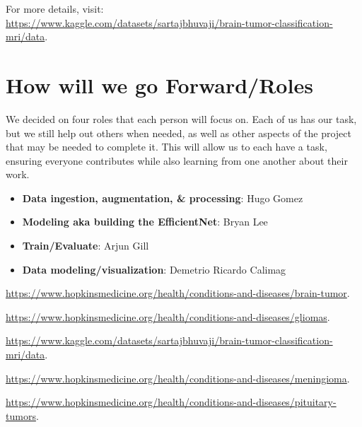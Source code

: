 \documentclass[11pt]{article}
\begin{document}
\noindent For more details, visit: \\
\href{https://www.kaggle.com/datasets/sartajbhuvaji/brain-tumor-classification-mri/data}{https://www.kaggle.com/datasets/sartajbhuvaji/brain-tumor-classification-mri/data}.

\section{How will we go Forward/Roles}
We decided on four roles that each person will focus on. Each of us has our task, but we still help out others
when needed, as well as other aspects of the project that may be needed to complete it.
This will allow us to each have a task, ensuring everyone contributes while also learning from one another about their work.
\begin{itemize}
    \item \textbf{Data ingestion, augmentation, \& processing}: Hugo Gomez
    \item \textbf{Modeling aka building the EfficientNet}: Bryan Lee
    \item \textbf{Train/Evaluate}: Arjun Gill
    \item \textbf{Data modeling/visualization}: Demetrio Ricardo Calimag
\end{itemize}

\newpage

\begin{thebibliography}{4}
    \url{https://www.hopkinsmedicine.org/health/conditions-and-diseases/brain-tumor}.
    
    \url{https://www.hopkinsmedicine.org/health/conditions-and-diseases/gliomas}.

    \url{https://www.kaggle.com/datasets/sartajbhuvaji/brain-tumor-classification-mri/data}.

    \url{https://www.hopkinsmedicine.org/health/conditions-and-diseases/meningioma}.

    \url{https://www.hopkinsmedicine.org/health/conditions-and-diseases/pituitary-tumors}.
\end{thebibliography}
\end{document}
